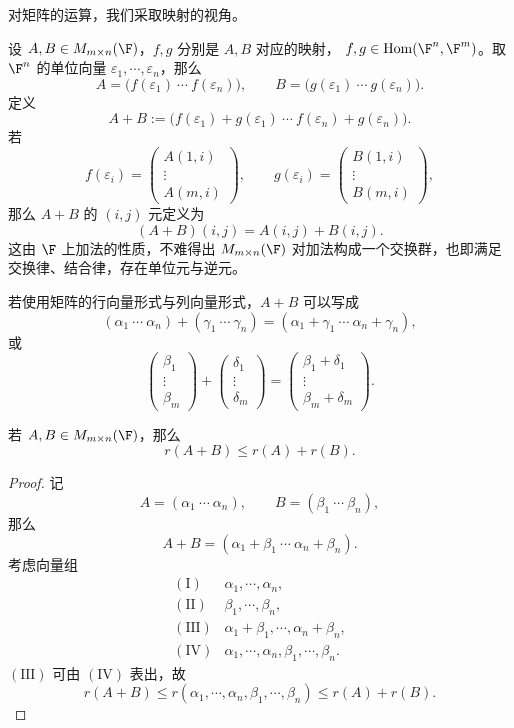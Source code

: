 对矩阵的运算，我们采取映射的视角。

\begin{definition}[矩阵加法]
	设 $A,B\in M_{m\times n}(\F)$，$f,g$ 分别是 $A,B$ 对应的映射，
	$f,g\in\operatorname{Hom}(\F^n,\F^m)$。取 $\F^n$ 的单位向量
	$\varepsilon_1,\cdots,\varepsilon_n$，那么
	\[
	A=\bigl(f(\varepsilon_1)\ \cdots\ f(\varepsilon_n)\bigr),
	\qquad
	B=\bigl(g(\varepsilon_1)\ \cdots\ g(\varepsilon_n)\bigr).
	\]
	定义
	\[
	A+B:=\bigl(f(\varepsilon_1)+g(\varepsilon_1)\ \cdots\
	f(\varepsilon_n)+g(\varepsilon_n)\bigr).
	\]
	若
	\[
	f(\varepsilon_i)=
	\begin{pmatrix}
		A(1,i)\\ \vdots\\ A(m,i)
	\end{pmatrix},
	\qquad
	g(\varepsilon_i)=
	\begin{pmatrix}
		B(1,i)\\ \vdots\\ B(m,i)
	\end{pmatrix},
	\]
	那么 $A+B$ 的 $(i,j)$ 元定义为
	\[
	(A+B)(i,j)=A(i,j)+B(i,j).
	\]
	这由 $\F$ 上加法的性质，不难得出
	$M_{m\times n}(\F)$ 对加法构成一个交换群，也即满足交换律、结合律，存在单位元与逆元。
	

\end{definition}
	若使用矩阵的行向量形式与列向量形式，$A+B$ 可以写成
\[
(\alpha_1\ \cdots\ \alpha_n)+(\gamma_1\ \cdots\ \gamma_n)
=(\alpha_1+\gamma_1\ \cdots\ \alpha_n+\gamma_n),
\]
或
\[
\begin{pmatrix}
	\beta_1\\ \vdots\\ \beta_m
\end{pmatrix}
+
\begin{pmatrix}
	\delta_1\\ \vdots\\ \delta_m
\end{pmatrix}
=
\begin{pmatrix}
	\beta_1+\delta_1\\ \vdots\\ \beta_m+\delta_m
\end{pmatrix}.
\]
\begin{proposition}
	若 $A,B\in M_{m\times n}(\F)$，那么
	\[
	r(A+B)\leq r(A)+r(B).
	\]
\end{proposition}

\begin{proof}
	记
	\[
	A=(\alpha_1\ \cdots\ \alpha_n),\qquad
	B=(\beta_1\ \cdots\ \beta_n),
	\]
	那么
	\[
	A+B=(\alpha_1+\beta_1\ \cdots\ \alpha_n+\beta_n).
	\]
	考虑向量组
	\[
	\begin{array}{ll}
		(\mathrm{I})&\alpha_1,\cdots,\alpha_n,\\
		(\mathrm{II})&\beta_1,\cdots,\beta_n,\\
		(\mathrm{III})&\alpha_1+\beta_1,\cdots,\alpha_n+\beta_n,\\
		(\mathrm{IV})&\alpha_1,\cdots,\alpha_n,\beta_1,\cdots,\beta_n.
	\end{array}
	\]
	$(\mathrm{III})$ 可由 $(\mathrm{IV})$ 表出，故
	\[
	r(A+B)
	\leq r(\alpha_1,\cdots,\alpha_n,\beta_1,\cdots,\beta_n)
	\leq r(A)+r(B).
	\]
\end{proof}

